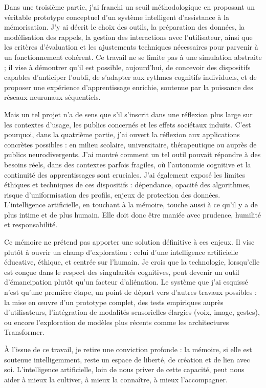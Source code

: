 \documentclass[11pt,a4paper]{report}
\begin{document}
Dans une troisième partie, j’ai franchi un seuil méthodologique en proposant un véritable prototype conceptuel d’un système intelligent d’assistance à la mémorisation. J’y ai décrit le choix des outils, la préparation des données, la modélisation des rappels, la gestion des interactions avec l’utilisateur, ainsi que les critères d’évaluation et les ajustements techniques nécessaires pour parvenir à un fonctionnement cohérent. Ce travail ne se limite pas à une simulation abstraite ; il vise à démontrer qu’il est possible, aujourd’hui, de concevoir des dispositifs capables d’anticiper l’oubli, de s’adapter aux rythmes cognitifs individuels, et de proposer une expérience d’apprentissage enrichie, soutenue par la puissance des réseaux neuronaux séquentiels.

Mais un tel projet n’a de sens que s’il s’inscrit dans une réflexion plus large sur les contextes d’usage, les publics concernés et les effets sociétaux induits. C’est pourquoi, dans la quatrième partie, j’ai ouvert la réflexion aux applications concrètes possibles : en milieu scolaire, universitaire, thérapeutique ou auprès de publics neurodivergents. J’ai montré comment un tel outil pouvait répondre à des besoins réels, dans des contextes parfois fragiles, où l’autonomie cognitive et la continuité des apprentissages sont cruciales. J’ai également exposé les limites éthiques et techniques de ces dispositifs : dépendance, opacité des algorithmes, risque d’uniformisation des profils, enjeux de protection des données. L’intelligence artificielle, en touchant à la mémoire, touche aussi à ce qu’il y a de plus intime et de plus humain. Elle doit donc être maniée avec prudence, humilité et responsabilité.

Ce mémoire ne prétend pas apporter une solution définitive à ces enjeux. Il vise plutôt à ouvrir un champ d’exploration : celui d’une intelligence artificielle éducative, éthique, et centrée sur l’humain. Je crois que la technologie, lorsqu’elle est conçue dans le respect des singularités cognitives, peut devenir un outil d’émancipation plutôt qu’un facteur d’aliénation. Le système que j’ai esquissé n’est qu’une première étape, un point de départ vers d’autres travaux possibles : la mise en œuvre d’un prototype complet, des tests empiriques auprès d’utilisateurs, l’intégration de modalités sensorielles élargies (voix, image, gestes), ou encore l’exploration de modèles plus récents comme les architectures Transformer.

À l’issue de ce travail, je retire une conviction profonde : la mémoire, si elle est soutenue intelligemment, reste un espace de liberté, de création et de lien avec soi. L’intelligence artificielle, loin de nous priver de cette capacité, peut nous aider à mieux la cultiver, à mieux la connaître, à mieux l’accompagner.
\end{document}
